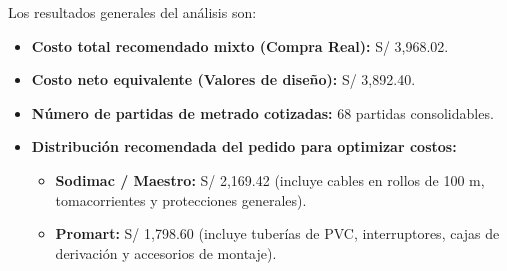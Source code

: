 \documentclass[12pt,letterpaper]{report}
\begin{document}
Los resultados generales del análisis son:
\begin{itemize}
  \item \textbf{Costo total recomendado mixto (Compra Real):} S/ 3,968.02.
  \item \textbf{Costo neto equivalente (Valores de diseño):} S/ 3,892.40.
  \item \textbf{Número de partidas de metrado cotizadas:} 68 partidas consolidables.
  \item \textbf{Distribución recomendada del pedido para optimizar costos:}
    \begin{itemize}
      \item \textbf{Sodimac / Maestro:} S/ 2,169.42 (incluye cables en rollos de 100 m, tomacorrientes y protecciones generales).
      \item \textbf{Promart:} S/ 1,798.60 (incluye tuberías de PVC, interruptores, cajas de derivación y accesorios de montaje).
    \end{itemize}
\end{itemize}

\clearpage

\end{document}

